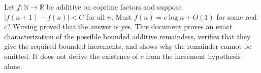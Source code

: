 Let $f:\mathbb N\to\mathbb R$ be additive on coprime factors and suppose $|f(n+1)-f(n)|<C$ for all $n$. Must $f(n)=c\log n+O(1)$ for some real $c$? Wirsing proved that the answer is yes. This document proves an exact characterization of the possible bounded additive remainders, verifies that they give the required bounded increments, and shows why the remainder cannot be omitted. It does not derive the existence of $c$ from the increment hypothesis alone.
